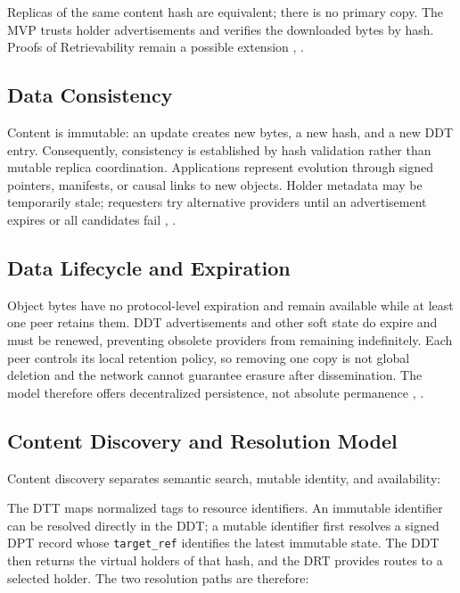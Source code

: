 \documentclass[
  12pt,
  oneside,
  a4paper,
  chapter=TITLE,
  section=TITLE,
  english,
  brazil
]{abntex2}
\begin{document}
Replicas of the same content hash are equivalent; there is no primary copy. The MVP
trusts holder advertisements and verifies the downloaded bytes by hash. Proofs of
Retrievability remain a possible extension \cite{augustine2022byzantine}, \cite{qian2016garlic}.

\subsection{Data Consistency}

Content is immutable: an update creates new bytes, a new hash, and a new DDT entry.
Consequently, consistency is established by hash validation rather than mutable
replica coordination. Applications represent evolution through signed pointers,
manifests, or causal links to new objects. Holder metadata may be temporarily stale;
requesters try alternative providers until an advertisement expires or all candidates
fail \cite{augustine2022byzantine}, \cite{qian2016garlic}.

\subsection{Data Lifecycle and Expiration}

Object bytes have no protocol-level expiration and remain available while at least one
peer retains them. DDT advertisements and other soft state do expire and must be
renewed, preventing obsolete providers from remaining indefinitely. Each peer controls
its local retention policy, so removing one copy is not global deletion and the network
cannot guarantee erasure after dissemination. The model therefore offers decentralized
persistence, not absolute permanence \cite{augustine2022byzantine}, \cite{qian2016garlic}.

\subsection{Content Discovery and Resolution Model}

Content discovery separates semantic search, mutable identity, and availability:

\thesisdtttikz

The DTT maps normalized tags to resource identifiers. An immutable identifier can be
resolved directly in the DDT; a mutable identifier first resolves a signed DPT record
whose \texttt{target\_ref} identifies the latest immutable state. The DDT then returns
the virtual holders of that hash, and the DRT provides routes to a selected holder.
The two resolution paths are therefore:
\end{document}
